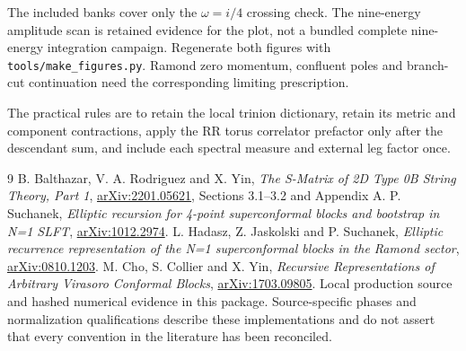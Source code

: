 \documentclass[11pt]{article}
\newcommand{\code}[1]{\texttt{\small #1}}
\begin{document}
The included banks cover only the \(\omega=i/4\) crossing check.
The nine-energy amplitude scan is retained evidence for the plot,
not a bundled complete nine-energy integration campaign.
Regenerate both figures with \code{tools/make\_figures.py}.
Ramond zero momentum, confluent poles and branch-cut continuation
need the corresponding limiting prescription.

The practical rules are to retain the local trinion dictionary,
retain its metric and component contractions, apply the RR torus
correlator prefactor only after the descendant sum, and include
each spectral measure and external leg factor once.

\clearpage
\begin{thebibliography}{9}
 B. Balthazar, V. A. Rodriguez and X. Yin,
\emph{The S-Matrix of 2D Type 0B String Theory, Part 1},
\href{https://arxiv.org/abs/2201.05621}{arXiv:2201.05621},
Sections 3.1--3.2 and Appendix A.
 P. Suchanek,
\emph{Elliptic recursion for 4-point superconformal blocks and bootstrap
in N=1 SLFT},
\href{https://arxiv.org/abs/1012.2974}{arXiv:1012.2974}.
 L. Hadasz, Z. Jaskolski and P. Suchanek,
\emph{Elliptic recurrence representation of the N=1 superconformal
blocks in the Ramond sector},
\href{https://arxiv.org/abs/0810.1203}{arXiv:0810.1203}.
 M. Cho, S. Collier and X. Yin,
\emph{Recursive Representations of Arbitrary Virasoro Conformal Blocks},
\href{https://arxiv.org/abs/1703.09805}{arXiv:1703.09805}.
 Local production source and hashed numerical evidence
in this package. Source-specific phases and normalization
qualifications describe these implementations and do not assert
that every convention in the literature has been reconciled.
\end{thebibliography}
\end{document}
